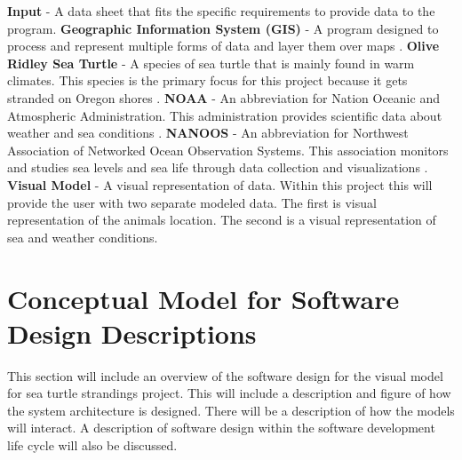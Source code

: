 \documentclass[onecolumn, draftclsnofoot,10pt, compsoc]{IEEEtran}
\begin{document}
\begin{singlespace}
    \textbf{Input} - A data sheet that fits the specific requirements to provide data to the program.\newline \newline
     \textbf{Geographic Information System (GIS)} - A program designed to process and represent multiple forms of data and layer them over maps \cite{2008Gfed}. \newline \newline
    \textbf{Olive Ridley Sea Turtle} - A species of sea turtle that is mainly found in warm climates. This species is the primary focus for this project because it gets stranded on Oregon shores \cite{noaa}. \newline \newline
    \textbf{NOAA} - An abbreviation for Nation Oceanic and Atmospheric Administration. This administration provides scientific data about weather and sea conditions \cite{noaa}. \newline \newline
    \textbf{NANOOS} - An abbreviation for Northwest Association of Networked Ocean Observation Systems.  This association monitors and studies sea levels and sea life through data collection and visualizations \cite{nanoos}. \newline \newline
    \textbf{Visual Model} - A visual representation of data. Within this project this will provide the user with two separate modeled data. The first is visual representation of the animals location. The second is a visual representation of sea and weather conditions. \newline \newline
   
    
    
\pagebreak  

\section{Conceptual Model for Software Design Descriptions}
This section will include an overview of the software design for the visual model for sea turtle strandings project. This will include a description and figure of how the system architecture is designed. There will be a description of how the models will interact. A description of software design within the software development life cycle will also be discussed. 
        

\end{singlespace}
\end{document}
